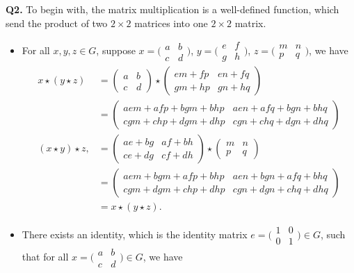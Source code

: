 \documentclass{article}[12pt]
\begin{document}
\noindent \textbf{Q2.}
To begin with, the matrix multiplication is a well-defined function, which send the product of two $2\times 2$ matrices into one $2\times 2$ matrix.
\begin{itemize} 
\item For all $x,y,z\in G$, suppose $x=\bigl( \begin{smallmatrix} a & b \\ c & d \end{smallmatrix} \bigr)$, $y=\bigl( \begin{smallmatrix} e & f \\ g & h \end{smallmatrix} \bigr)$, $z=\bigl( \begin{smallmatrix} m &n \\ p & q \end{smallmatrix} \bigr)$, we have 
\begin{align*}
x\star (y\star z)
&=\left( \begin{matrix}a & b\\c & d\end{matrix}\right) \star  \left( \begin{matrix}em+fp & en+fq\\gm+hp & gn+hq\end{matrix}\right)\\
&= \left( \begin{matrix}aem+afp+bgm+bhp & aen+afq+bgn+bhq\\cgm+chp+dgm+dhp & cgn+chq+dgn+dhq\end{matrix}\right)\\
(x\star y)\star z,
&= \left( \begin{matrix}ae+bg & af+bh\\ce+dg & cf+dh\end{matrix}\right)\star \left( \begin{matrix}m & n\\p & q\end{matrix}\right)\\
&= \left( \begin{matrix}aem+bgm+afp+bhp & aen+bgn+afq+bhq\\cgm+dgm+chp+dhp & cgn+dgn+chq+dhq\end{matrix}\right)\\
&=x\star (y\star z).
\end{align*}
\item There exists an identity, which is the identity matrix $e=\bigl( \begin{smallmatrix} 1 & 0 \\ 0 & 1 \end{smallmatrix} \bigr)\in G$, such that for all $x=\bigl( \begin{smallmatrix} a & b \\ c & d \end{smallmatrix} \bigr)\in G$, we have 

\end{itemize}
\end{document}
